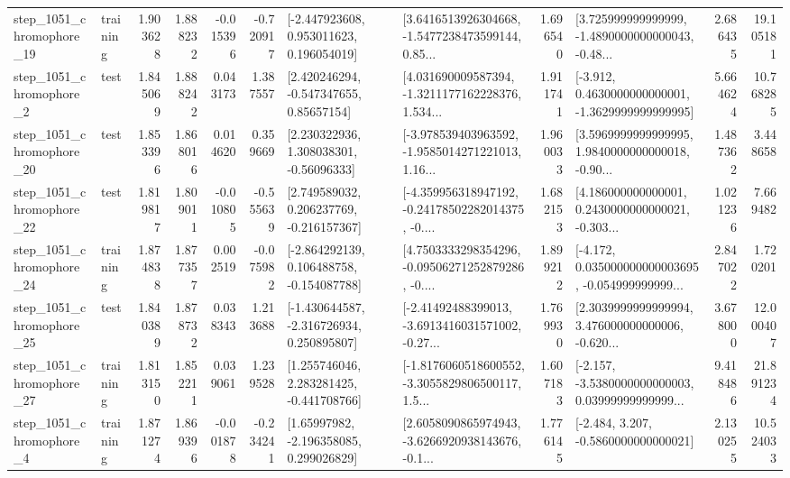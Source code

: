 \begin{tabular}{llrrrrllrlrr}
 step\_1051\_chromophore\_19 &  training &      1.903628 &    1.888232 &     -0.015396 & -0.720917 &    [-2.447923608, 0.953011623, 0.196054019] &  [3.6416513926304668, -1.5477238473599144, 0.85... &       1.696540 &  [3.725999999999999, -1.4890000000000043, -0.48... &            2.686435 &         19.105181 \\
  step\_1051\_chromophore\_2 &      test &      1.845069 &    1.888242 &      0.043173 &  1.387557 &     [2.420246294, -0.547347655, 0.85657154] &  [4.031690009587394, -1.3211177162228376, 1.534... &       1.911741 &  [-3.912, 0.4630000000000001, -1.3629999999999995] &            5.664624 &         10.768285 \\
 step\_1051\_chromophore\_20 &      test &      1.853396 &    1.868016 &      0.014620 &  0.359669 &     [2.230322936, 1.308038301, -0.56096333] &  [-3.978539403963592, -1.9585014271221013, 1.16... &       1.960033 &  [3.5969999999999995, 1.9840000000000018, -0.90... &            1.487362 &          3.448658 \\
 step\_1051\_chromophore\_22 &      test &      1.819817 &    1.809011 &     -0.010805 & -0.555639 &    [2.749589032, 0.206237769, -0.216157367] &  [-4.359956318947192, -0.24178502282014375, -0.... &       1.682153 &  [4.186000000000001, 0.2430000000000021, -0.303... &            1.021236 &          7.669482 \\
 step\_1051\_chromophore\_24 &  training &      1.874838 &    1.877357 &      0.002519 & -0.075982 &   [-2.864292139, 0.106488758, -0.154087788] &  [4.7503333298354296, -0.09506271252879286, -0.... &       1.899212 &  [-4.172, 0.035000000000003695, -0.054999999999... &            2.847022 &          1.720201 \\
 step\_1051\_chromophore\_25 &      test &      1.840389 &    1.878732 &      0.038343 &  1.213688 &   [-1.430644587, -2.316726934, 0.250895807] &  [-2.41492488399013, -3.6913416031571002, -0.27... &       1.769930 &  [2.3039999999999994, 3.476000000000006, -0.620... &            3.678000 &         12.000407 \\
 step\_1051\_chromophore\_27 &  training &      1.813150 &    1.852211 &      0.039061 &  1.239528 &    [1.255746046, 2.283281425, -0.441708766] &  [-1.8176060518600552, -3.3055829806500117, 1.5... &       1.607183 &  [-2.157, -3.5380000000000003, 0.03999999999999... &            9.418486 &         21.891234 \\
  step\_1051\_chromophore\_4 &  training &      1.871274 &    1.869396 &     -0.001878 & -0.234241 &     [1.65997982, -2.196358085, 0.299026829] &  [2.6058090865974943, -3.6266920938143676, -0.1... &       1.776145 &               [-2.484, 3.207, -0.5860000000000021] &            2.130255 &         10.524033 \\

\end{tabular}
